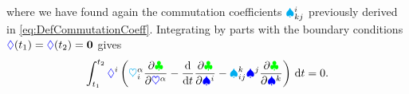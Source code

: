 where we have found again the commutation coefficients $\BoltzSym{\LidxI}{\LidxIII}{\LidxII}$ previously derived in \eqref{eq:DefCommutationCoeff}.
Integrating by parts with the boundary conditions $\varCoord(t_1) = \varCoord(t_2) = \tuple{0}$ gives
\begin{align}
 \int_{t_1}^{t_2} \varCoordCoeff{\LidxI} \left( \kinMatCoeff{\GidxI}{\LidxI} \pdiff[\Lagrangian]{\sysCoordCoeff{\GidxI}} - \diff{t} \pdiff[\Lagrangian]{\sysVelCoeff{\LidxI}} - \BoltzSym{\LidxIII}{\LidxI}{\LidxII} \sysVelCoeff{\LidxII} \pdiff[\Lagrangian]{\sysVelCoeff{\LidxIII}} \right) \, \d t = 0.
\end{align}
